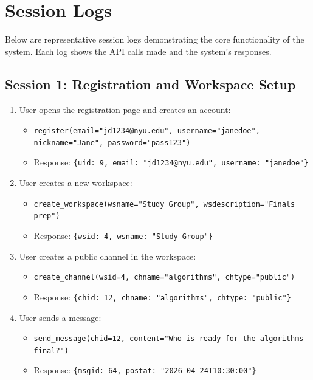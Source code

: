 \documentclass[11pt]{article}
\begin{document}
\newpage
\section{Session Logs}
\label{sec:session}

Below are representative session logs demonstrating the core functionality of the system. Each log shows the API calls made and the system's responses.

\subsection{Session 1: Registration and Workspace Setup}

\begin{enumerate}
    \item User opens the registration page and creates an account:
    \begin{itemize}
        \item \texttt{register(email="jd1234@nyu.edu", username="janedoe", nickname="Jane", password="pass123")}
        \item Response: \texttt{\{uid: 9, email: "jd1234@nyu.edu", username: "janedoe"\}}
    \end{itemize}

    \item User creates a new workspace:
    \begin{itemize}
        \item \texttt{create\_workspace(wsname="Study Group", wsdescription="Finals prep")}
        \item Response: \texttt{\{wsid: 4, wsname: "Study Group"\}}
    \end{itemize}

    \item User creates a public channel in the workspace:
    \begin{itemize}
        \item \texttt{create\_channel(wsid=4, chname="algorithms", chtype="public")}
        \item Response: \texttt{\{chid: 12, chname: "algorithms", chtype: "public"\}}
    \end{itemize}

    \item User sends a message:
    \begin{itemize}
        \item \texttt{send\_message(chid=12, content="Who is ready for the algorithms final?")}
        \item Response: \texttt{\{msgid: 64, postat: "2026-04-24T10:30:00"\}}
    \end{itemize}
\end{enumerate}
\end{document}
